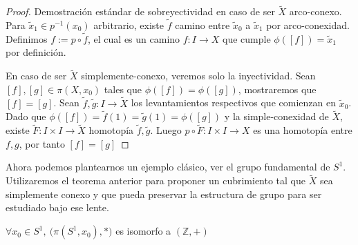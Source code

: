\begin{proof}
  Demostración estándar de sobreyectividad en caso de ser \(\tilde X\)
  arco-conexo. Para \(\tilde x _1 \in p^{-1} (x_0)\) arbitrario, existe
  \(\tilde f\) camino entre \(\tilde x _0 \) a \(\tilde x _1\) por
  arco-conexidad. Definimos \(f := p \circ \tilde f\), el cual es un
  camino \(f : I \to X\) que cumple \(\phi ([f]) = \tilde x _1\) por
  definición.

  En caso de ser \(\tilde X\) simplemente-conexo, veremos solo la
  inyectividad. Sean \([f],[g] \in \pi (X, x_0)\) tales que \(\phi([f])
  = \phi([g])\), mostraremos que \([f] = [g]\). Sean \(\tilde f, \tilde
  g : I \to \tilde X\) los levantamientos respectivos que comienzan en
  \(\tilde x _0\). Dado que \(\phi([f]) = \tilde f (1) = \tilde g (1) =
  \phi([g])\) y la simple-conexidad de \(\tilde X\), existe \(\tilde F :
  I \times I \to \tilde X\) homotopía \(\tilde f, \tilde g\). Luego \(p
  \circ \tilde F : I \times I \to X \) es una homotopía entre \(f, g\),
  por tanto \([f] = [g]\)
\end{proof}
Ahora podemos plantearnos un ejemplo clásico, ver el grupo fundamental
de \(S^1\). Utilizaremos el teorema anterior para proponer un
cubrimiento tal que \(\tilde X\) sea simplemente conexo y que pueda
preservar la estructura de grupo para ser estudiado bajo ese lente.
\begin{teorema} \label{thm:grupo-S1}
  \(\forall x_0 \in S^1,\ \big( \pi (S^1,x_0), * \big)\) es isomorfo a
  \((\mathbb Z, +)\)
\end{teorema}
